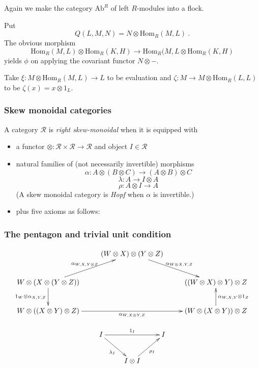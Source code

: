 \documentclass{beamer}
\newcommand{\lra}{\longrightarrow}
\def\CR{{\mathscr R}}
\begin{document}
\begin{frame}
\begin{example}
Again we make the category $\mathrm{Ab}^R$ of left $R$-modules into a flock.

Put $$Q(L,M,N)=N\otimes \mathrm{Hom}_R(M,L) \ .$$
\pause
The obvious morphism
$$\mathrm{Hom}_R(M,L)\otimes \mathrm{Hom}_R(K,H) \lra \mathrm{Hom}_R(M,L\otimes \mathrm{Hom}_R(K,H)$$
yields $\phi$ on applying the covariant functor $N\otimes-$.

\pause
\bigskip
Take $\xi : M\otimes \mathrm{Hom}_R(M,L) \lra L$ to be evaluation 
\bigskip
and $\zeta : M \lra M\otimes \mathrm{Hom}_R(L,L)$ to be $\zeta(x) = x\otimes 1_L$. 

\end{example}
\end{frame}
\begin{frame}
  \frametitle{Skew monoidal categories}

A category $\CR$ is {\em right skew-monoidal} when it is equipped with 

  \begin{itemize}
\item<1-> a functor $\otimes : \CR \times \CR \lra \CR$ and object $I\in \CR$ 

\item<2-> natural families of (not necessarily invertible) morphisms 
$$\alpha : A\otimes (B\otimes C) \lra (A\otimes B)\otimes C$$ 
$$\lambda : A\lra I\otimes A$$
$$\rho : A\otimes I \lra A$$ 
(A skew monoidal category is {\em Hopf} when $\alpha$ is invertible.)
\item<3-> plus five axioms as follows:

\end{itemize}

\end{frame}


\begin{frame}
  \frametitle{The pentagon and trivial unit condition}
  
\begin{equation}\label{pentagon}
\xymatrix{
& (W\otimes X)\otimes (Y\otimes Z) \ar[rd]^-{{\alpha_{W\otimes X,Y, Z}}}  & \\
W\otimes (X\otimes (Y\otimes Z)) \ar[ru]^-{{\alpha_{W, X,Y\otimes Z}}} \ar[d]_-{1_W\otimes {\alpha_{X, Y,Z}}} & & ((W\otimes X)\otimes Y)\otimes Z  \\
W\otimes ((X\otimes Y)\otimes Z) \ar[rr]_-{{\alpha_{W,X\otimes Y,Z}}} & &  (W\otimes (X\otimes Y))\otimes Z\ar[u]_-{{\alpha_{W,X,Y}} \otimes 1_Z} }
\end{equation}

\begin{equation}\label{unitunit}
\xymatrix{
I \ar[rd]_{\lambda_I}\ar[rr]^{1_I}   && I  \\
& I\otimes I \ar[ru]_{\rho_I} 
}
\end{equation}
\end{frame}
\end{document}
